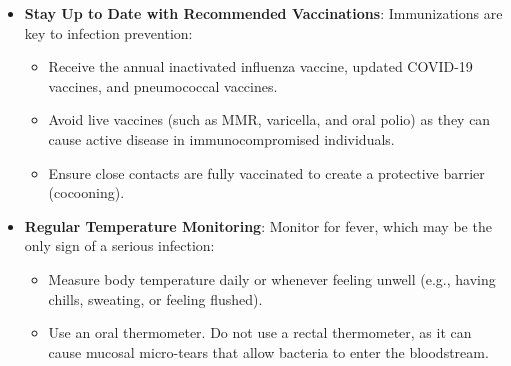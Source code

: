 \begin{itemize}
\begin{itemize}
      \item Clean minor wounds immediately with soap and water, apply an antiseptic, and cover with a sterile bandage.
      \item Keep skin moisturized to prevent cracking, and avoid popping pimples or squeezing blemishes.
    \end{itemize}
  \item \textbf{Stay Up to Date with Recommended Vaccinations}: Immunizations are key to infection prevention:
    \begin{itemize}
      \item Receive the annual inactivated influenza vaccine, updated COVID-19 vaccines, and pneumococcal vaccines.
      \item Avoid live vaccines (such as MMR, varicella, and oral polio) as they can cause active disease in immunocompromised individuals.
      \item Ensure close contacts are fully vaccinated to create a protective barrier (cocooning).
    \end{itemize}
  \item \textbf{Regular Temperature Monitoring}: Monitor for fever, which may be the only sign of a serious infection:
    \begin{itemize}
      \item Measure body temperature daily or whenever feeling unwell (e.g., having chills, sweating, or feeling flushed).
      \item Use an oral thermometer. Do not use a rectal thermometer, as it can cause mucosal micro-tears that allow bacteria to enter the bloodstream.
    \end{itemize}
\end{itemize}

